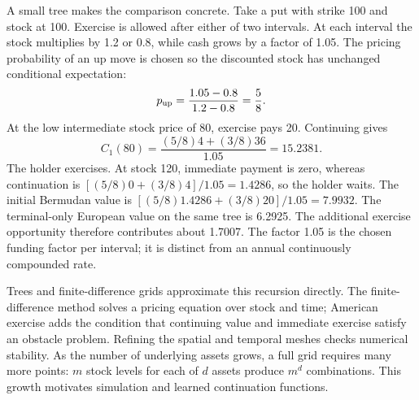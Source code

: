 \documentclass[8pt]{strategynet-journal}
\begin{document}
\begin{SNcolumns}
A small tree makes the comparison concrete. Take a put with strike 100 and
stock at 100. Exercise is allowed after either of two intervals. At each
interval the stock multiplies by 1.2 or 0.8, while cash grows by a factor of
1.05. The pricing probability of an up move is chosen so the discounted stock
has unchanged conditional expectation:
\[
 p_{\rm up}=\frac{1.05-0.8}{1.2-0.8}=\frac58.
\]
At the low intermediate stock price of 80, exercise pays 20. Continuing gives
\[
 C_1(80)=\frac{(5/8)4+(3/8)36}{1.05}=15.2381.
\]
The holder exercises. At stock 120, immediate payment is zero, whereas
continuation is $[(5/8)0+(3/8)4]/1.05=1.4286$, so the holder waits. The initial
Bermudan value is $[(5/8)1.4286+(3/8)20]/1.05=7.9932$. The terminal-only
European value on the same tree is 6.2925. The additional exercise opportunity
therefore contributes about 1.7007. The factor 1.05 is the chosen funding
factor per interval; it is distinct from an annual continuously compounded rate.

\begin{center}\begin{minipage}{\linewidth}\centering
{}
\end{minipage}\end{center}

Trees and finite-difference grids approximate this recursion directly.
The finite-difference method solves a pricing equation over stock and time;
American exercise adds the condition that continuing value and immediate
exercise satisfy an obstacle problem. Refining the spatial and temporal
meshes checks numerical stability. As the number of underlying assets grows,
a full grid requires many more points: $m$ stock levels for each of $d$ assets
produce $m^d$ combinations. This growth motivates simulation and learned
continuation functions.


\end{SNcolumns}
\end{document}
